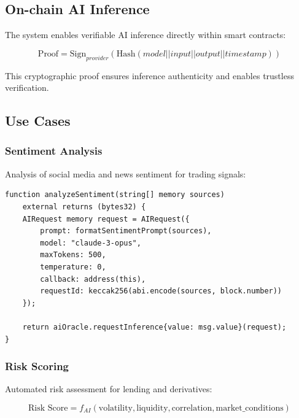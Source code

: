 \subsection{On-chain AI Inference}

The system enables verifiable AI inference directly within smart contracts:

\begin{equation}
\text{Proof} = \text{Sign}_{provider}(\text{Hash}(model || input || output || timestamp))
\end{equation}

This cryptographic proof ensures inference authenticity and enables trustless verification.

\subsection{Use Cases}

\subsubsection{Sentiment Analysis}
Analysis of social media and news sentiment for trading signals:

\begin{lstlisting}[caption={Sentiment Analysis Request}]
function analyzeSentiment(string[] memory sources) 
    external returns (bytes32) {
    AIRequest memory request = AIRequest({
        prompt: formatSentimentPrompt(sources),
        model: "claude-3-opus",
        maxTokens: 500,
        temperature: 0,
        callback: address(this),
        requestId: keccak256(abi.encode(sources, block.number))
    });
    
    return aiOracle.requestInference{value: msg.value}(request);
}
\end{lstlisting}

\subsubsection{Risk Scoring}
Automated risk assessment for lending and derivatives:

\begin{equation}
\text{Risk Score} = f_{AI}(\text{volatility}, \text{liquidity}, \text{correlation}, \text{market\_conditions})
\end{equation}

